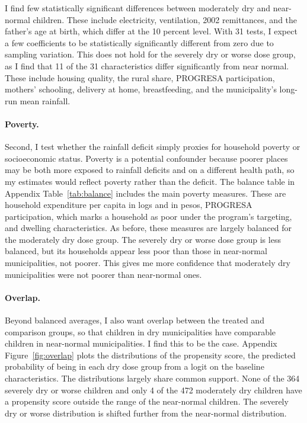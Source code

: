 \documentclass[12pt]{article}
\begin{document}
I find few statistically significant differences between moderately dry and near-normal children. These include electricity, ventilation, 2002 remittances, and the father's age at birth, which differ at the 10 percent level. With 31 tests, I expect a few coefficients to be statistically significantly different from zero due to sampling variation. This does not hold for the severely dry or worse dose group, as I find that 11 of the 31 characteristics differ significantly from near normal. These include housing quality, the rural share, PROGRESA participation, mothers' schooling, delivery at home, breastfeeding, and the municipality's long-run mean rainfall.

\paragraph{Poverty.} Second, I test whether the rainfall deficit simply proxies for household poverty or socioeconomic status. Poverty is a potential confounder because poorer places may be both more exposed to rainfall deficits and on a different health path, so my estimates would reflect poverty rather than the deficit. The balance table in Appendix Table~\ref{tab:balance} includes the main poverty measures. These are household expenditure per capita in logs and in pesos, PROGRESA participation, which marks a household as poor under the program's targeting, and dwelling characteristics. As before, these measures are largely balanced for the moderately dry dose group. The severely dry or worse dose group is less balanced, but its households appear less poor than those in near-normal municipalities, not poorer. This gives me more confidence that moderately dry municipalities were not poorer than near-normal ones.

\paragraph{Overlap.} Beyond balanced averages, I also want overlap between the treated and comparison groups, so that children in dry municipalities have comparable children in near-normal municipalities. I find this to be the case. Appendix Figure~\ref{fig:overlap} plots the distributions of the propensity score, the predicted probability of being in each dry dose group from a logit on the baseline characteristics. The distributions largely share common support. None of the 364 severely dry or worse children and only 4 of the 472 moderately dry children have a propensity score outside the range of the near-normal children. The severely dry or worse distribution is shifted further from the near-normal distribution.
\end{document}
